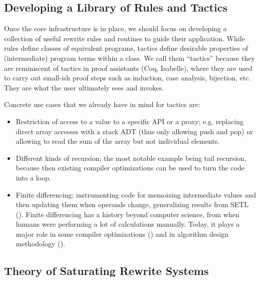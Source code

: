\subsection{Developing a Library of Rules and Tactics}

Once the core infrastructure is in place, we should focus on developing
a collection of useful rewrite rules and routines to guide their application.
While rules define classes of equivalent programs, tactics define desirable
properties of (intermediate) program terms within a class.
We call them ``tactics'' because they are reminiscent of tactics in proof
assistants (Coq, Isabelle), where they are used to carry out
small-ish proof steps such as induction, case analysis, bijection, etc.
They are what the user ultimately sees and invokes.

Concrete use cases that we already have in mind for tactics are:

\begin{itemize}
  \item Restriction of access to a value to a specific API or a proxy;
    e.g. replacing direct array accesses with a stack ADT (thus only allowing push and pop)
    or allowing to read the sum of the array but not individual elements.
  \item Different kinds of recursion; the most notable example being
    tail recursion, because then existing compiler optimizations can be
    used to turn the code into a loop.
  \item Finite differencing; instrumenting code for memoizing intermediate
    values and then updating them when operands change, generalizing results
    from SETL (\cite{TOPLAS1982/Paige,ESOP1990/Paige}).
    Finite differencing has a history beyond computer science, from when
    humans were performing a lot of calculations manually.
    Today, it plays a major role in some compiler optimizations
    (\cite{CACM1997/Cocke})
    and in algorithm design methodology (\cite{Book1997/Dijkstra,VHLL1974/Earley}).
\end{itemize}

\subsection{Theory of Saturating Rewrite Systems}

